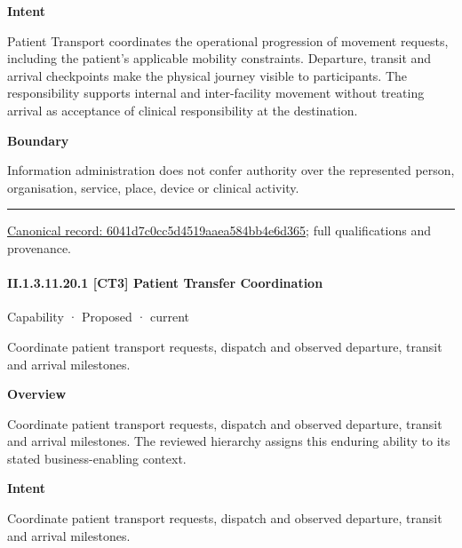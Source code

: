 \textbf{Intent}



Patient Transport coordinates the operational progression of movement requests, including the patient's applicable mobility constraints. Departure, transit and arrival checkpoints make the physical journey visible to participants. The responsibility supports internal and inter-facility movement without treating arrival as acceptance of clinical responsibility at the destination.



\textbf{Boundary}



Information administration does not confer authority over the represented person, organisation, service, place, device or clinical activity.



\medskip\hrule\medskip

{\footnotesize \href{../../../../continuum/strategy/capability/6041d7c0cc5d4519aaea584bb4e6d365.md}{Canonical record: 6041d7c0cc5d4519aaea584bb4e6d365}; full qualifications and provenance.}\par
\paragraph*{II.1.3.11.20.1 [CT3] Patient Transfer Coordination}
\label{navigation:II.1.3.11.20.1}

\label{element:c7c7aa8e34df4568ae4b91cdde380a11}
{\small Capability · Proposed · current}\par

Coordinate patient transport requests, dispatch and observed departure, transit and arrival milestones.



\textbf{Overview}



Coordinate patient transport requests, dispatch and observed departure, transit and arrival milestones. The reviewed hierarchy assigns this enduring ability to its stated business-enabling context.



\textbf{Intent}



Coordinate patient transport requests, dispatch and observed departure, transit and arrival milestones.



